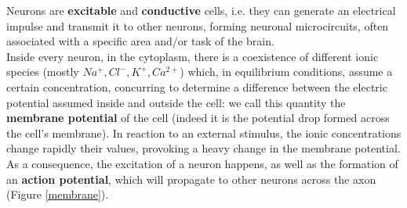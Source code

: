\documentclass[12pt, a4paper]{report}
\begin{document}
	Neurons are \textbf{excitable} and \textbf{conductive} cells, i.e. they can generate an electrical impulse and transmit it to other neurons, forming neuronal microcircuits, often associated with a specific area and/or task of the brain. \\
	Inside every neuron, in the cytoplasm, there is a coexistence of different ionic species (mostly $Na^+, Cl^-, K^+, Ca^{2+}$) which, in equilibrium conditions, assume a certain concentration, concurring to determine a difference between the electric potential assumed inside and outside the cell: we call this quantity the \textbf{membrane potential} of the cell (indeed it is the potential drop formed across the cell's membrane).  In reaction to an external stimulus, the ionic concentrations change rapidly their values, provoking a heavy change in the membrane potential. As a consequence, the excitation of a neuron happens, as well as the formation of an \textbf{action potential}, which will propagate to other neurons across the axon (Figure \ref{membrane}). 
\end{document}
